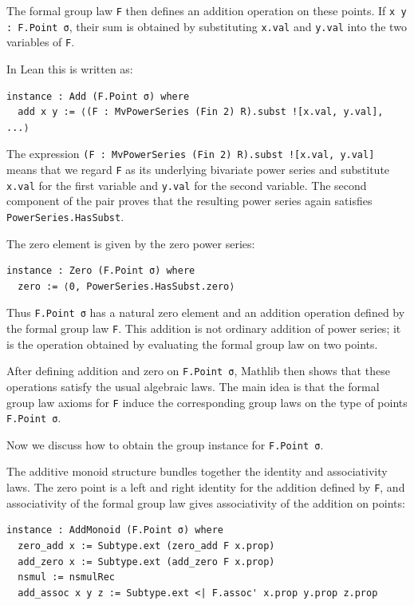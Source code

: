 The formal group law \lstinline|F| then defines an addition operation on
these points.  If \lstinline|x y : F.Point σ|, their sum is obtained by
substituting \lstinline|x.val| and \lstinline|y.val| into the two
variables of \lstinline|F|.

In Lean this is written as:
\begin{lstlisting}
instance : Add (F.Point σ) where
  add x y := ⟨(F : MvPowerSeries (Fin 2) R).subst ![x.val, y.val], ...⟩
\end{lstlisting}

The expression
\lstinline|(F : MvPowerSeries (Fin 2) R).subst ![x.val, y.val]|
means that we regard \lstinline|F| as its underlying bivariate power
series and substitute \lstinline|x.val| for the first variable and
\lstinline|y.val| for the second variable.
The second component of the pair proves that the resulting power series
again satisfies \lstinline|PowerSeries.HasSubst|.

The zero element is given by the zero power series:
\begin{lstlisting}
instance : Zero (F.Point σ) where
  zero := ⟨0, PowerSeries.HasSubst.zero⟩
\end{lstlisting}

Thus \lstinline|F.Point σ| has a natural zero element and an addition
operation defined by the formal group law \lstinline|F|.  This addition
is not ordinary addition of power series; it is the operation obtained by
evaluating the formal group law on two points.

After defining addition and zero on \lstinline|F.Point σ|, Mathlib then
shows that these operations satisfy the usual algebraic laws.  The main
idea is that the formal group law axioms for \lstinline|F| induce the
corresponding group laws on the type of points \lstinline|F.Point σ|.

Now we discuss how to obtain the group instance for
\lstinline|F.Point σ|.

The additive monoid structure bundles together the identity and
associativity laws.  The zero point is a left and right identity for the
addition defined by \lstinline|F|, and associativity of the formal group
law gives associativity of the addition on points:
\begin{lstlisting}
instance : AddMonoid (F.Point σ) where
  zero_add x := Subtype.ext (zero_add F x.prop)
  add_zero x := Subtype.ext (add_zero F x.prop)
  nsmul := nsmulRec
  add_assoc x y z := Subtype.ext <| F.assoc' x.prop y.prop z.prop
\end{lstlisting}

